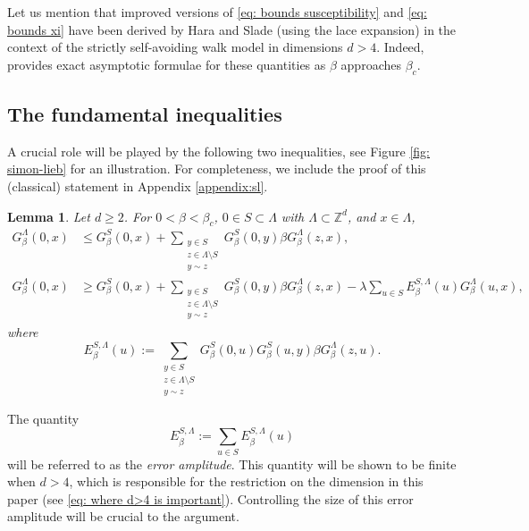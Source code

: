 \documentclass[11pt,a4paper]{article}
\numberwithin{equation}{section}
\theoremstyle{plain}
\newtheorem{Lem}[Thm]{Lemma}
\theoremstyle{definition}
\newcommand\bfC{\mathbf{C}}
\begin{document}
Let us mention that improved versions of \eqref{eq: bounds susceptibility} and \eqref{eq: bounds xi} have been derived by Hara and Slade \cite{HaraSlade1992SAW} (using the lace expansion) in the context of the strictly self-avoiding walk model in dimensions $d>4$. Indeed, \cite[Theorem~1.2]{HaraSlade1992SAW} provides exact asymptotic formulae for these quantities as $\beta$ approaches $\beta_c$.

\subsection{The fundamental inequalities}
A crucial role will be played by the following two inequalities, see Figure \ref{fig: simon-lieb} for an illustration. For completeness, we include the  proof of this (classical) statement in Appendix \ref{appendix:sl}.

\begin{Lem}\label{Lem: Simon-Lieb WSAW} Let $d\geq 2$. For $0<\beta<\beta_c$, $0\in S\subset \Lambda$ with $\Lambda\subset \mathbb Z^d$, and $x\in \Lambda$, 
\begin{align}\label{eq:SL}
G_\beta^\Lambda(0,x)&\le G_\beta^S(0,x)+ \sum_{\substack{y\in S\\ z\in \Lambda\setminus S\\ y\sim z}}G_\beta^S(0,y)\beta G_\beta^\Lambda(z,x),\\
G_\beta^\Lambda(0,x)&\ge G_\beta^S(0,x)+\sum_{\substack{y\in S\\ z\in \Lambda\setminus S\\ y\sim z}}G_\beta^S(0,y)\beta G_\beta^\Lambda(z,x)- \lambda \sum_{u\in S}E_\beta^{S,\Lambda}(u)G_\beta^\Lambda(u,x),\label{eq:reversed SL}
\end{align}
where 
\begin{equation}
E_\beta^{S,\Lambda}(u):=\sum_{\substack{y \in S\\ z\in \Lambda\setminus S\\ y\sim z}}G_\beta^S(0,u)G_\beta^S(u,y) \beta G_\beta^\Lambda(z,u).
\end{equation}
\end{Lem}

The quantity
\begin{equation}
E_\beta^{S,\Lambda}:=\sum_{u\in S}E_\beta^{S,\Lambda}(u)
\end{equation}
will be referred to as the {\em error amplitude}. This quantity will be shown to be finite when $d>4$, which is responsible for the restriction on the dimension in this paper (see \eqref{eq: where d>4 is important}). Controlling the size of this error amplitude will be crucial to the argument.
\end{document}
